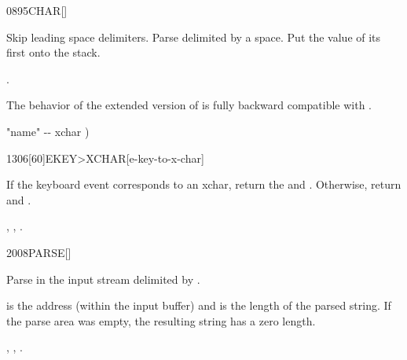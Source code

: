 \begin{worddef}{0895}{CHAR}[]
\item {}

	Skip leading space delimiters.  Parse  delimited by a space.
	Put the value of its first  onto the stack.

\see {}.

	\begin{rationale}
		The behavior of the extended version of  is fully backward
		compatible with .
	\end{rationale}

	\begin{implement}
	\word{:}   "name" -{}- xchar )
		      \word{;}
	\end{implement}
\end{worddef}


\vspace*{-0.75ex}
\begin{worddef}[EKEYtoXCHAR]{1306}[60]{EKEY>XCHAR}[e-key-to-x-char]
\item {}

	If the keyboard event  corresponds to an xchar, return the
	 and .  Otherwise, return  and
	.

\see {},
	,
	.
\end{worddef}


\vspace*{-0.75ex}
\begin{worddef}{2008}{PARSE}[]
\item {}

  Parse  in the input stream delimited by .

	 is the address (within the input buffer) and 
	is the length of the parsed string. If the parse area was empty, the
	resulting string has a zero length.

\see {},
	,
	.
\end{worddef}



